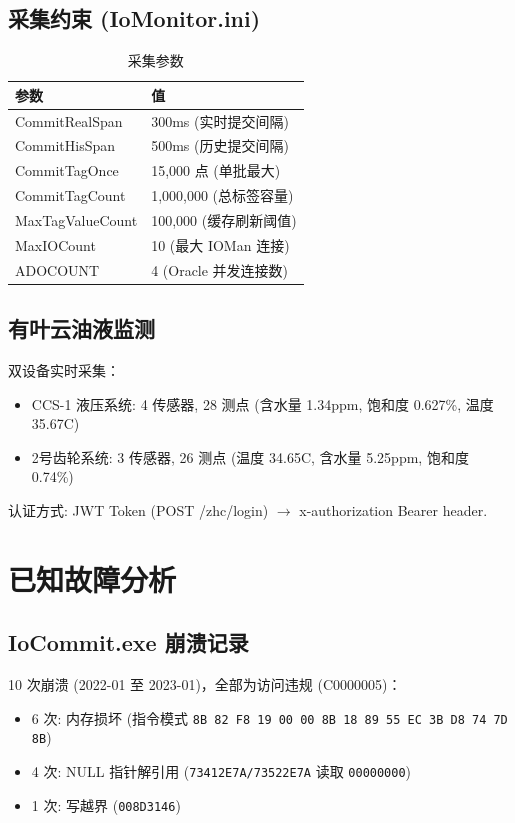 \documentclass[12pt,a4paper]{ctexart}
\begin{document}
\subsection{采集约束 (IoMonitor.ini)}

\begin{table}[H]\centering
\caption{采集参数}
\begin{tabular}{p{5cm}p{7cm}}
\toprule
\textbf{参数} & \textbf{值} \\
\midrule
CommitRealSpan & 300ms (实时提交间隔) \\
CommitHisSpan & 500ms (历史提交间隔) \\
CommitTagOnce & 15,000 点 (单批最大) \\
CommitTagCount & 1,000,000 (总标签容量) \\
MaxTagValueCount & 100,000 (缓存刷新阈值) \\
MaxIOCount & 10 (最大 IOMan 连接) \\
ADOCOUNT & 4 (Oracle 并发连接数) \\
\bottomrule
\end{tabular}
\end{table}

\subsection{有叶云油液监测}

双设备实时采集：
\begin{itemize}[leftmargin=*]
  \item CCS-1 液压系统: 4 传感器, 28 测点 (含水量 1.34ppm, 饱和度 0.627\%, 温度 35.67\textdegree C)
  \item 2号齿轮系统: 3 传感器, 26 测点 (温度 34.65\textdegree C, 含水量 5.25ppm, 饱和度 0.74\%)
\end{itemize}
认证方式: JWT Token (POST /zhc/login) $\rightarrow$ x-authorization Bearer header.

\section{已知故障分析}

\subsection{IoCommit.exe 崩溃记录}

10 次崩溃 (2022-01 至 2023-01)，全部为访问违规 (C0000005)：
\begin{itemize}[leftmargin=*]
  \item 6 次: 内存损坏 (指令模式 \texttt{8B 82 F8 19 00 00 8B 18 89 55 EC 3B D8 74 7D 8B})
  \item 4 次: NULL 指针解引用 (\texttt{73412E7A/73522E7A} 读取 \texttt{00000000})
  \item 1 次: 写越界 (\texttt{008D3146})
\end{itemize}
\end{document}
